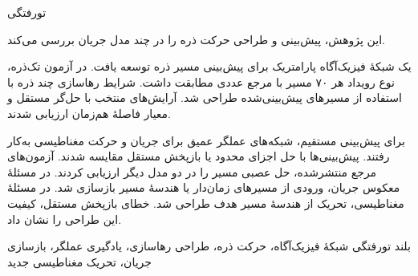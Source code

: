 


‌تورفتگی

این پژوهش، پیش‌بینی و طراحی حرکت ذره را در چند مدل جریان بررسی می‌کند.

یک شبکهٔ فیزیک‌آگاه پارامتریک برای پیش‌بینی مسیر ذره توسعه یافت.
در آزمون تک‌ذره، نوع رویداد هر ۷۰ مسیر با مرجع عددی مطابقت داشت.
شرایط رهاسازی چند ذره با استفاده از مسیرهای پیش‌بینی‌شده طراحی شد.
آرایش‌های منتخب با حل‌گر مستقل و معیار فاصلهٔ هم‌زمان ارزیابی شدند.

برای پیش‌بینی مستقیم، شبکه‌های عملگر عمیق برای جریان و حرکت مغناطیسی به‌کار رفتند.
پیش‌بینی‌ها با حل اجزای محدود یا بازپخش مستقل مقایسه شدند.
آزمون‌های مرجع منتشرشده، حل عصبی مسیر را در دو مدل دیگر ارزیابی کردند.
در مسئلهٔ معکوس جریان، ورودی از مسیرهای زمان‌دار یا هندسهٔ مسیر بازسازی شد.
در مسئلهٔ مغناطیسی، تحریک از هندسهٔ مسیر هدف طراحی شد.
خطای بازپخش مستقل، کیفیت این طراحی را نشان داد.

‌بلند
‌تورفتگی 
شبکهٔ فیزیک‌آگاه، حرکت ذره، طراحی رهاسازی، یادگیری عملگر، بازسازی جریان، تحریک مغناطیسی
‌جدید
